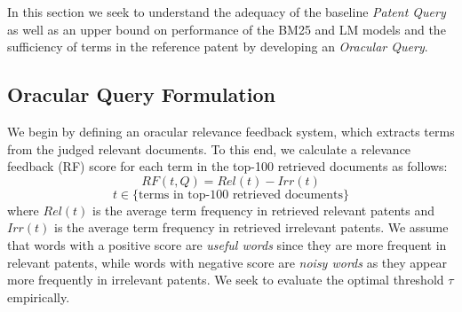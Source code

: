 %

In this section we seek to understand the adequacy of the baseline
\emph{Patent Query} as well as an upper bound on performance of the
BM25 and LM models and the sufficiency of terms in the reference patent 
by developing an \emph{Oracular Query}.

\subsection{Oracular Query Formulation}

We begin by defining an oracular relevance feedback system, which
extracts terms from the judged relevant documents.  To this end, we
calculate a relevance feedback (RF) score for each term in the top-100
retrieved documents as follows:
\begin{equation}
RF(t,Q)=Rel(t)-Irr(t) 
 \label{eq:score}
\end{equation}\vspace*{-5ex}
\begin{displaymath}t\in \lbrace \mbox{terms in top-100 retrieved documents}\rbrace\end{displaymath}
where $ Rel(t) $ is the average term frequency in retrieved relevant patents and $ Irr(t) $ is the average term frequency in retrieved irrelevant patents. We assume that words with a positive score are {\em useful words} since they are more frequent in relevant patents, while words with negative score are {\em noisy words} as they appear more frequently in irrelevant patents.  We seek to evaluate the optimal threshold $\tau$ empirically.

%

